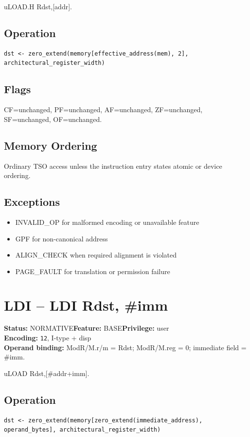 \documentclass[10pt]{article}
\begin{document}
uLOAD.H Rdst,[addr].

\subsection*{Operation}
\begin{lstlisting}
dst <- zero_extend(memory[effective_address(mem), 2], architectural_register_width)
\end{lstlisting}
\subsection*{Flags}
CF=unchanged, PF=unchanged, AF=unchanged, ZF=unchanged, SF=unchanged, OF=unchanged.
\subsection*{Memory Ordering}
Ordinary TSO access unless the instruction entry states atomic or device ordering.
\subsection*{Exceptions}
\begin{itemize}
\item INVALID\_OP for malformed encoding or unavailable feature
\item GPF for non-canonical address
\item ALIGN\_CHECK when required alignment is violated
\item PAGE\_FAULT for translation or permission failure
\end{itemize}
\clearpage

\section{LDI -- LDI Rdst, \#imm}
\textbf{Status:} NORMATIVE\quad \textbf{Feature:} BASE\quad \textbf{Privilege:} user\\
\textbf{Encoding:} \texttt{12}, I-type + disp\\
\textbf{Operand binding:} ModR/M.r/m = Rdst; ModR/M.reg = 0; immediate field = \#imm.

uLOAD Rdst,[\#addr+imm].

\subsection*{Operation}
\begin{lstlisting}
dst <- zero_extend(memory[zero_extend(immediate_address), operand_bytes], architectural_register_width)
\end{lstlisting}
\end{document}
